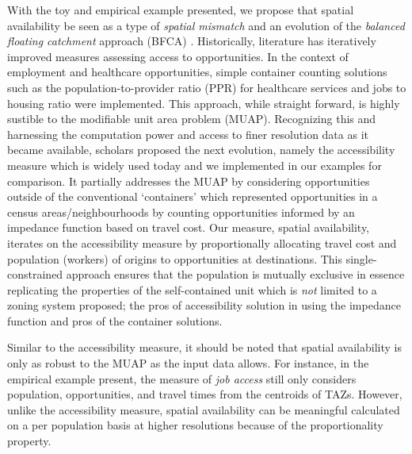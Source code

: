 \documentclass[]{elsarticle} %
\begin{document}
With the toy and empirical example presented, we propose that spatial
availability be seen as a type of \emph{spatial mismatch} and an
evolution of the \emph{balanced floating catchment} approach (BFCA) .
Historically, literature has iteratively improved measures assessing
access to opportunities. In the context of employment and healthcare
opportunities, simple container counting solutions such as the
population-to-provider ratio (PPR) for healthcare services and jobs to
housing ratio were implemented. This approach, while straight forward,
is highly sustible to the modifiable unit area problem (MUAP).
Recognizing this and harnessing the computation power and access to
finer resolution data as it became available, scholars proposed the next
evolution, namely the accessibility measure which is widely used today
and we implemented in our examples for comparison. It partially
addresses the MUAP by considering opportunities outside of the
conventional `containers' which represented opportunities in a census
areas/neighbourhoods by counting opportunities informed by an impedance
function based on travel cost. Our measure, spatial availability,
iterates on the accessibility measure by proportionally allocating
travel cost and population (workers) of origins to opportunities at
destinations. This single-constrained approach ensures that the
population is mutually exclusive in essence replicating the properties
of the self-contained unit which is \emph{not} limited to a zoning
system proposed; the pros of accessibility solution in using the
impedance function and pros of the container solutions.

Similar to the accessibility measure, it should be noted that spatial
availability is only as robust to the MUAP as the input data allows. For
instance, in the empirical example present, the measure of \emph{job
access} still only considers population, opportunities, and travel times
from the centroids of TAZs. However, unlike the accessibility measure,
spatial availability can be meaningful calculated on a per population
basis at higher resolutions because of the proportionality property.
\end{document}
